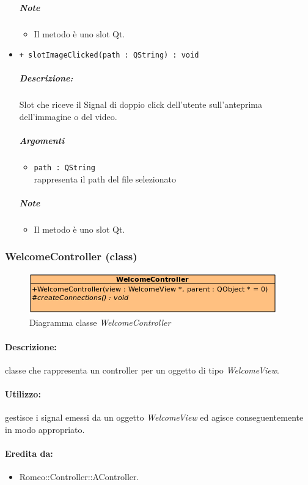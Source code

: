 \begin{itemize}
			\subparagraph{Note}
			\begin{itemize}
				\item Il metodo è uno slot\g{} Qt\g{}.
			\end{itemize}
			\item \color{blue} \verb!+ slotImageClicked(path : QString) : void!
			\color{black}
			\subparagraph{Descrizione:} Slot\g{} che riceve il Signal\g{} di doppio click dell'utente sull'anteprima dell'immagine o del video.
			\color{black}
			\subparagraph{Argomenti}
			\begin{itemize}
				\item \color{RoyalPurple} \verb!path : QString!\\				
\color{black} rappresenta il path del file selezionato
			\end{itemize}
			\subparagraph{Note}
			\begin{itemize}
				\item Il metodo è uno slot\g{} Qt\g{}.
			\end{itemize}
		\end{itemize}
	\subsubsection{WelcomeController (class)}
	\begin{figure}[!h]
		\centering
		\includegraphics[scale=2.75]{./Content/Immagini/controller/WelcomeController}
		\caption{Diagramma classe \textsl{WelcomeController}}
	\end{figure}
	\paragraph{Descrizione:} classe che rappresenta un controller per un oggetto di tipo \textsl{WelcomeView}.
	\paragraph{Utilizzo:} gestisce i signal\g{} emessi da un oggetto \textsl{WelcomeView} ed agisce conseguentemente in modo appropriato.
	\paragraph{Eredita da:}
		\begin{itemize}
			\item Romeo::Controller::AController.
		\end{itemize}
